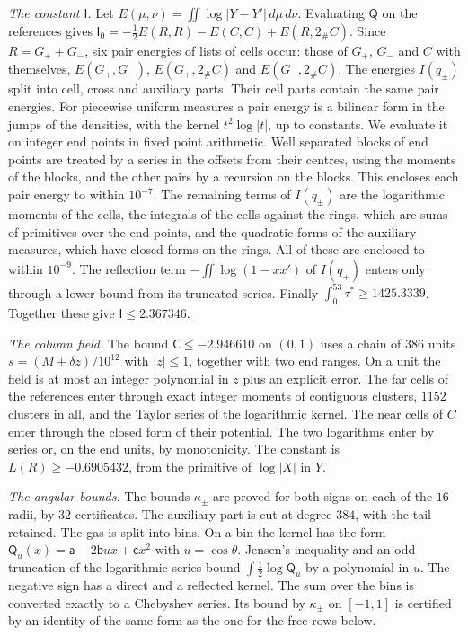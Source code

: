 \documentclass[11pt]{amsart}
\theoremstyle{definition}
\theoremstyle{remark}
\numberwithin{equation}{section}
\begin{document}
\emph{The constant $\mathsf I$.} Let $E(\mu,\nu)=\iint\log|Y-Y'|\,d\mu\,d\nu$. Evaluating $\mathsf Q$ on the references gives $\mathsf I_0=-\frac12E(R,R)-E(C,C)+E(R,2_\#C)$. Since $R=G_++G_-$, six pair
energies of lists of cells occur: those of $G_+$, $G_-$ and $C$ with themselves, $E(G_+,G_-)$, $E(G_+,2_\#C)$ and $E(G_-,2_\#C)$. The energies $I(q_\pm)$ split into cell, cross and auxiliary parts. Their cell parts contain the same
pair energies. For piecewise uniform measures a pair energy is a bilinear form in the jumps of the densities, with the kernel $t^2\log|t|$, up to constants. We evaluate it on integer end points in fixed point arithmetic. Well separated blocks of end points are
treated by a series in the offsets from their centres, using the moments of the blocks, and the other pairs by a recursion on the blocks. This encloses each pair energy to within $10^{-7}$. The remaining terms of $I(q_\pm)$ are the logarithmic moments of the cells,
the integrals of the cells against the rings, which are sums of primitives over the end points, and the quadratic forms of the auxiliary measures, which have closed forms on the rings. All of these are enclosed to within $10^{-9}$. The reflection term $-\iint\log(1-xx')$ of $I(q_+)$
enters only through a lower bound from its truncated series. Finally $\int_0^{53}\tau^*\ge1425.3339$. Together these give $\mathsf I\le2.367346$.

\emph{The column field.} The bound $\mathsf C\le-2.946610$ on $(0,1)$ uses a chain of $386$ units $s=(M+\delta z)/10^{12}$ with $|z|\le1$, together with two end ranges. On a unit the field is at most an integer polynomial in $z$ plus an explicit
error. The far cells of the references enter through exact integer moments of contiguous clusters, $1152$ clusters in all, and the Taylor series of the logarithmic kernel. The near cells of $C$ enter through the closed form of their potential. The two logarithms enter by
series or, on the end units, by monotonicity. The constant is $L(R)\ge-0.6905432$, from the primitive of $\log|X|$ in $Y$.

\emph{The angular bounds.} The bounds $\kappa_\pm$ are proved for both signs on each of the $16$ radii, by $32$ certificates. The auxiliary part is cut at degree $384$, with the tail retained. The gas is split into bins. On a bin the kernel has the form
$\mathsf Q_u(x)=\mathsf a-2\mathsf bux+\mathsf cx^2$ with $u=\cos\theta$. Jensen's inequality and an odd truncation of the logarithmic series bound $\int\frac12\log\mathsf Q_u$ by a polynomial in $u$. The negative sign has a direct and a reflected kernel. The sum over the bins
is converted exactly to a Chebyshev series. Its bound by $\kappa_\pm$ on $[-1,1]$ is certified by an identity of the same form as the one for the free rows below.
\end{document}
